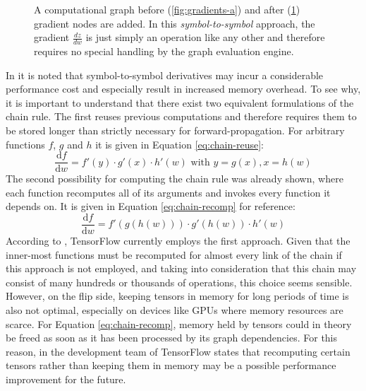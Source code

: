 \begin{figure}
\begin{subfigure}[b]{0.2\textwidth}
    \caption{}
    \label{fig:gradients-b}
  \end{subfigure}
  \caption{A computational graph before (\ref{fig:gradients-a}) and after
    (\ref{fig:gradients-b}) gradient nodes are added. In this
    \emph{symbol-to-symbol} approach, the gradient $\frac{dz}{dw}$ is just
    simply an operation like any other and therefore requires no special
    handling by the graph evaluation engine.}
  \label{fig:gradients}
\end{figure}

In \cite{tensorflow} it is noted that symbol-to-symbol derivatives may incur a
considerable performance cost and especially result in increased memory
overhead. To see why, it is important to understand that there exist two
equivalent formulations of the chain rule. The first reuses previous
computations and therefore requires them to be stored longer than strictly
necessary for forward-propagation. For arbitrary functions $f$, $g$ and $h$ it is
given in Equation \ref{eq:chain-reuse}:
\begin{equation}\label{eq:chain-reuse}
  \frac{\mathrm{d} f}{\mathrm{d} w} = f'(y) \cdot g'(x) \cdot h'(w) \text{ with } y = g(x), x =
  h(w)
\end{equation}
The second possibility for computing the chain rule was already shown, where
each function recomputes all of its arguments and invokes every function it
depends on. It is given in Equation \ref{eq:chain-recomp} for reference:
\begin{equation}\label{eq:chain-recomp}
  \frac{\mathrm{d} f}{\mathrm{d} w} = f'(g(h(w))) \cdot g'(h(w)) \cdot h'(w)
\end{equation}
According to \cite{tensorflow}, TensorFlow currently employs the first
approach. Given that the inner-most functions must be recomputed for almost
every link of the chain if this approach is not employed, and taking into
consideration that this chain may consist of many hundreds or thousands of
operations, this choice seems sensible. However, on the flip side, keeping
tensors in memory for long periods of time is also not optimal, especially on
devices like GPUs where memory resources are scarce. For Equation
\ref{eq:chain-recomp}, memory held by tensors could in theory be freed as soon
as it has been processed by its graph dependencies. For this reason, in
\cite{tensorflow} the development team of TensorFlow states that recomputing
certain tensors rather than keeping them in memory may be a possible performance
improvement for the future.

